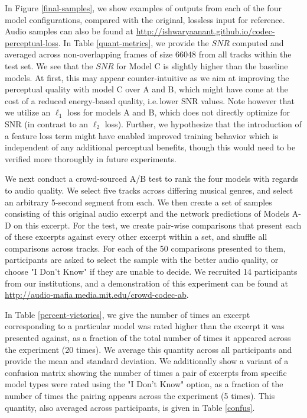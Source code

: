 \documentclass[sigconf]{acmart}
\begin{document}
In Figure \ref{final-samples}, we show examples of outputs from each of the four model configurations, compared with the original, lossless input for reference.  Audio samples can also be found at \url{http://ishwaryaanant.github.io/codec-perceptual-loss}.  In Table \ref{quant-metrics}, we provide the $SNR$ computed and averaged across non-overlapping frames of size 66048 from all tracks within the test set.  We see that the $SNR$ for Model C is slightly higher than the baseline models.
At first, this may appear counter-intuitive as we aim at improving the perceptual quality with model C over A and B, which might have come at the cost of a reduced energy-based quality, i.e.\,lower SNR values. Note however that we utilize an $\ell_{1}$ loss for models A and B, which does not directly optimize for SNR (in contrast to an $\ell_{2}$ loss). Further, we hypothesize that the introduction of a feature loss term might have enabled improved training behavior which is independent of any additional perceptual benefits, though this would need to be verified more thoroughly in future experiments.

We next conduct a crowd-sourced A/B test to rank the four models with regards to audio quality. We select five tracks across differing musical genres, and select an arbitrary 5-second segment from each.  We then create a set of samples consisting of this original audio excerpt and the network predictions of Models A-D on this excerpt.  For the test, we create pair-wise comparisons that present each of these excerpts against every other excerpt within a set, and shuffle all comparisons across tracks.  For each of the 50 comparisons presented to them, participants are asked to select the sample with the better audio quality, or choose "I Don't Know" if they are unable to decide.  We recruited 14 participants from our institutions, and a demonstration of this experiment can be found at \url{http://audio-mafia.media.mit.edu/crowd-codec-ab}.

In Table \ref{percent-victories}, we give the number of times an excerpt corresponding to a particular model was rated higher than the excerpt it was presented against, as a fraction of the total number of times it appeared across the experiment (20 times). We average this quantity across all participants and provide the mean and standard deviation.  We additionally show a variant of a confusion matrix showing the number of times a pair of excerpts from specific model types were rated using the "I Don't Know" option, as a fraction of the number of times the pairing appears across the experiment (5 times).  This quantity, also averaged across participants, is given in Table \ref{confus}. 
\end{document}
